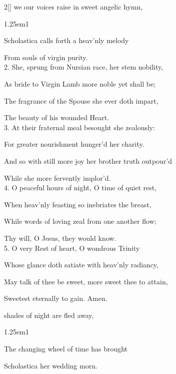 \begin{paracol}{2}[]
 we our voices raise in sweet angelic hymn,


\begin{hangparas}{1.25em}{1}

Scholastica calls forth a heav'nly melody

From souls of virgin purity.\\

2. She, sprung from Nursian race, her stem nobility,

As bride to Virgin Lamb more noble yet shall be;

The fragrance of the Spouse she ever doth impart,

The beauty of his wounded Heart.\\

3. At their fraternal meal besought she zealously:

For greater nourishment hunger'd her charity.

And so with still more joy her brother truth outpour'd

While she more fervently implor'd.\\

4. O peaceful hours of night, O time of quiet rest,

When heav'nly feasting so inebriates the breast,

While words of loving zeal from one another flow;

Thy will, O Jesus, they would know.\\

5. O very Rest of heart, O wondrous Trinity

Whose glance doth satiate with heav'nly radiancy,

May talk of thee be sweet, more sweet thee to attain,

Sweetest eternally to gain. Amen.
\end{hangparas}

\mattinsOfficeHymn\label{ScholasticaMattins}

 shades of night are fled away,


\begin{hangparas}{1.25em}{1}

The changing wheel of time has brought

Scholastica her wedding morn.\\


\end{hangparas}
\end{paracol}
